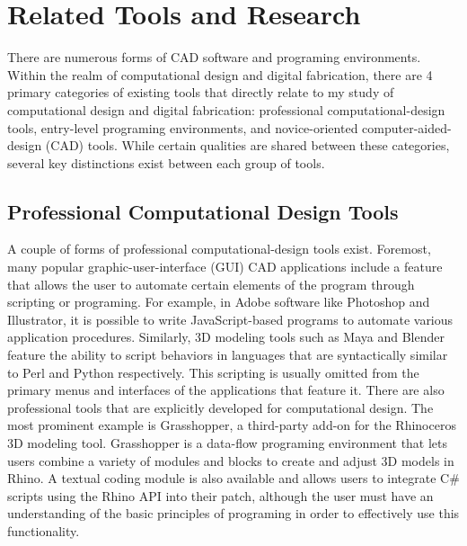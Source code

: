 \chapter{Related Tools and Research}
There are numerous forms of CAD software and programing environments. Within the realm of computational design and digital fabrication, there are 4 primary categories of existing tools  that directly relate to my study of computational design and digital fabrication: professional computational-design tools, entry-level programing environments, and novice-oriented computer-aided-design (CAD) tools. While certain qualities are shared between these categories, several key distinctions exist between each group of tools.  

\section{Professional Computational Design Tools}
A couple of forms of professional computational-design tools exist. Foremost, many popular graphic-user-interface (GUI) CAD applications include a feature that allows the user to automate certain elements of the program through scripting or programing. For example, in Adobe software like Photoshop and Illustrator, it is possible to write JavaScript-based programs to automate various application procedures. Similarly, 3D modeling tools such as Maya and Blender feature the ability to script behaviors in languages that are syntactically similar to Perl and Python respectively. This scripting is usually omitted from the primary menus and interfaces of the applications that feature it. 
There are also professional tools that are explicitly developed for computational design. The most prominent example is Grasshopper, a third-party add-on for the Rhinoceros 3D modeling tool. Grasshopper is a data-flow programing environment that lets users combine a variety of modules and blocks to create and adjust 3D models in Rhino. A textual coding module is also available and allows users to integrate C\# scripts using the Rhino API into their patch, although the user must have an understanding of the basic principles of programing in order to effectively use this functionality. 

